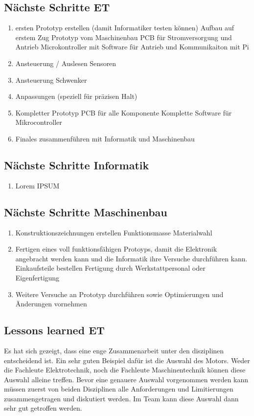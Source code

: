 \documentclass[../../main.tex]{subfiles}
\begin{document}
\subsection{Nächste Schritte ET}
\begin{enumerate}
    \item ersten Prototyp erstellen (damit Informatiker testen können)
        \subitem Aufbau auf erstem Zug Prototyp vom Maschinenbau
        \subitem PCB für Stromversorgung und Antrieb
        \subitem Microkontroller mit Software für Antrieb und Kommunikaiton mit Pi 
    \item Ansteuerung / Auslesen Sensoren
    \item Ansteuerung Schwenker
    \item Anpassungen (speziell für präzisen Halt)
    \item Kompletter Prototyp
        \subitem PCB für alle Komponente
        \subitem Komplette Software für Mikrocontroller
    \item Finales zusammenführen mit Informatik und Maschinenbau
\end{enumerate}

\subsection{Nächste Schritte Informatik}
\begin{enumerate}
    \item Lorem IPSUM
\end{enumerate}

\subsection{Nächste Schritte Maschinenbau}
\begin{enumerate}
    \item Konstruktionszeichnungen erstellen
    \subitem Funktionsmasse
    \subitem Materialwahl
    \item Fertigen eines voll funktionsfähigen Protoyps, damit die Elektronik angebracht werden kann und die Informatik ihre Versuche durchführen kann.
    \subitem Einkaufsteile bestellen
    \subitem Fertigung durch Werkstattpersonal oder Eigenfertigung
    \item Weitere Versuche an Prototyp durchführen sowie Optimierungen und Änderungen vornehmen
\end{enumerate}

\subsection{Lessons learned ET}
Es hat sich gezeigt, dass eine enge Zusammenarbeit unter den disziplinen entscheidend ist. Ein sehr guten Beispiel dafür ist die Auswahl des Motors. Weder die Fachleute Elektrotechnik, noch die Fachleute Maschinentechnik können diese Auswahl alleine treffen. Bevor eine genauere Auswahl vorgenommen werden kann müssen zuerst von beiden Disziplinen alle Anforderungen und Limitierungen zusammengetragen und diskutiert werden. Im Team kann diese Auswahl dann sehr gut getroffen werden.
\end{document}
